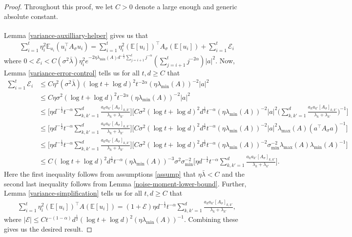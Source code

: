 \documentclass[11pt, reqno,english]{amsart}
\begin{document}
\begin{proof}
Throughout this proof, we let $C > 0$ denote a large enough and generic absolute constant.
\\\\
Lemma \ref{variance-auxilliary-helper} gives us that
\begin{align*}
\sum_{i = 1}^t \eta_i^2 \mathbb{E}_{u_i}(u_i^\top A_{\sigma} u_i) = \sum_{i = 1}^t \eta_i^2(\mathbb{E}[u_i])^\top A_{\sigma} (\mathbb{E}[u_i]) + \sum_{i = 1}^t\mathcal E_i
\end{align*}
where $0 < \mathcal E_i <  C(\sigma^2 \bar{\lambda}) \eta_i^2 e^{-2\eta \lambda_{\min}(A) d^{-\frac{1}{2}}\sum_{j = i+1}^t j^{-\alpha}}(\sum_{j = i+1}^t j^{-2\alpha}) |a|^2$. Now, Lemma \ref{variance-error-control} tells us for all $t, d \geq C$ that
\begin{align*}
    \sum_{i = 1}^t \mathcal E_i &\leq C\eta^2(\sigma^2 \bar{\lambda})(\log t + \log d)^2 t^{-2\alpha} (\eta\lambda_{\min}(A))^{-2}|a|^2
    \\
    &\leq C\eta\sigma^2(\log t + \log d)^2 t^{-2\alpha} (\eta\lambda_{\min}(A))^{-2}|a|^2
    \\
    &\leq \bigg[\eta d^{-\frac{1}{2}}t^{-\alpha}\sum_{k,k' = 1}^d\frac{a_k a_{k'}[A_{\sigma}]_{k,k'}}{\lambda_k + \lambda_{k'}}\bigg]\bigg[C\sigma^2(\log t + \log d)^2 d^{\frac{1}{2}}t^{-\alpha} (\eta\lambda_{\min}(A))^{-2}|a|^2 \bigg(\sum_{k,k' = 1}^d\frac{a_k a_{k'}[A_{\sigma}]_{k,k'}}{\lambda_k + \lambda_{k'}}\bigg)^{-1}\bigg]
    \\
    &\leq \bigg[\eta d^{-\frac{1}{2}}t^{-\alpha}\sum_{k,k' = 1}^d\frac{a_k a_{k'}[A_{\sigma}]_{k,k'}}{\lambda_k + \lambda_{k'}}\bigg]\bigg[C\sigma^2(\log t + \log d)^2 d^{\frac{1}{2}}t^{-\alpha} (\eta\lambda_{\min}(A))^{-2}|a|^2 \lambda_{\max}(A)(a^\top A_{\sigma}a)^{-1}\bigg]
    \\
    &\leq \bigg[\eta d^{-\frac{1}{2}}t^{-\alpha}\sum_{k,k' = 1}^d\frac{a_k a_{k'}[A_{\sigma}]_{k,k'}}{\lambda_k + \lambda_{k'}}\bigg]\bigg[C\sigma^2(\log t + \log d)^2 d^{\frac{1}{2}}t^{-\alpha} (\eta\lambda_{\min}(A))^{-2}\sigma^{-2}_{\min}\lambda_{\max}(A)\lambda_{\min}(A)^{-1}\bigg]
    \\
    &\leq C(\log t + \log d)^2 d^{\frac{1}{2}}t^{-\alpha} (\eta\lambda_{\min}(A))^{-3}\sigma^2\sigma^{-2}_{\min}\bigg[\eta d^{-\frac{1}{2}}t^{-\alpha}\sum_{k,k' = 1}^d\frac{a_k a_{k'}[A_{\sigma}]_{k,k'}}{\lambda_k + \lambda_{k'}}\bigg].
\end{align*}
Here the first inequality follows from assumptions \ref{assump} that $\eta \bar{\lambda} < C$ and the second last inequality follows from Lemma \ref{noise-moment-lower-bound}. Further, Lemma \ref{variance-simplification} tells us for all $t,d \geq C$ that
\begin{align*}
    \sum_{i = 1}^t \eta_i^2 (\mathbb{E}[u_i])^\top A (\mathbb{E}[u_i]) = (1+\mathcal E)\eta d^{-\frac{1}{2}}t^{-\alpha}\sum_{k,k' = 1}^d \frac{a_k a_{k'}[A_{\sigma}]_{k,k'}}{\lambda_{k} + \lambda_{k'}},
\end{align*}
where $|\mathcal E| \leq Ct^{-(1 - \alpha)}d^{\frac{1}{2}}(\log t + \log d)^2 (\eta \lambda_{\min}(A))^{-1}$. Combining these gives us the desired result.
\end{proof}
\end{document}
